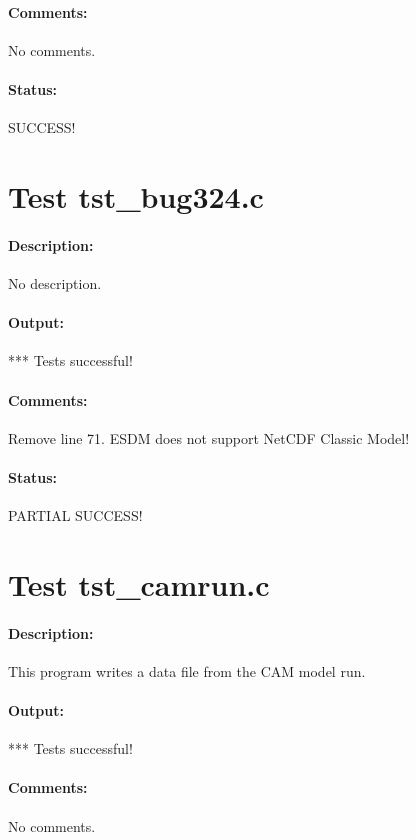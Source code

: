 \paragraph{Comments:} No comments.

\paragraph{Status:} SUCCESS!

\section{Test tst\_bug324.c}

\paragraph{Description:} No description.

\paragraph{Output:} *** Tests successful!

\paragraph{Comments:} Remove line 71. ESDM does not support NetCDF Classic Model!

\paragraph{Status:} PARTIAL SUCCESS!

\section{Test tst\_camrun.c}

\paragraph{Description:} This program writes a data file from the CAM model run.

\paragraph{Output:} *** Tests successful!

\paragraph{Comments:} No comments.

